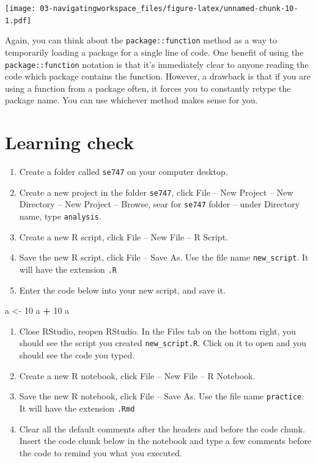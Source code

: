 \documentclass[
]{book}
\newenvironment{Shaded}{\begin{snugshade}}{\end{snugshade}}
\newcommand{\DecValTok}[1]{\textcolor[rgb]{0.00,0.00,0.81}{#1}}
\newcommand{\NormalTok}[1]{#1}
\newcommand{\OperatorTok}[1]{\textcolor[rgb]{0.81,0.36,0.00}{\textbf{#1}}}
\newcommand{\StringTok}[1]{\textcolor[rgb]{0.31,0.60,0.02}{#1}}
\begin{document}
\texttt{[image: 03-navigatingworkspace\_files/figure-latex/unnamed-chunk-10-1.pdf]}

Again, you can think about the \texttt{package::function} method as a way to temporarily loading a package for a single line of code. One benefit of using the \texttt{package::function} notation is that it's immediately clear to anyone reading the code which package contains the function. However, a drawback is that if you are using a function from a package often, it forces you to constantly retype the package name. You can use whichever method makes sense for you.

\hypertarget{learning-check}{%
\section*{Learning check}\label{learning-check}}

\begin{enumerate}
\def\labelenumi{\arabic{enumi}.}
\item
  Create a folder called \texttt{se747} on your computer desktop.
\item
  Create a new project in the folder \texttt{se747}, click File -- New Project -- New Directory -- New Project -- Browse, sear for \texttt{se747} folder -- under Directory name, type \texttt{analysis}.
\item
  Create a new R script, click File -- New File -- R Script.
\item
  Save the new R script, click File -- Save As. Use the file name \texttt{new\_script}. It will have the extension \texttt{.R}
\item
  Enter the code below into your new script, and save it.
\end{enumerate}

\begin{Shaded}
\begin{Highlighting}[]
\NormalTok{a <-}\StringTok{ }\DecValTok{10}
\NormalTok{a }\OperatorTok{+}\StringTok{ }\DecValTok{10}
\NormalTok{a}
\end{Highlighting}
\end{Shaded}

\begin{enumerate}
\def\labelenumi{\arabic{enumi}.}
\setcounter{enumi}{5}
\item
  Close RStudio, reopen RStudio. In the Files tab on the bottom right, you should see the script you created \texttt{new\_script.R}. Click on it to open and you should see the code you typed.
\item
  Create a new R notebook, click File -- New File -- R Notebook.
\item
  Save the new R notebook, click File -- Save As. Use the file name \texttt{practice}. It will have the extension \texttt{.Rmd}
\item
  Clear all the default comments after the headers and before the code chunk. Insert the code chunk below in the notebook and type a few comments before the code to remind you what you executed.
\end{enumerate}
\end{document}
